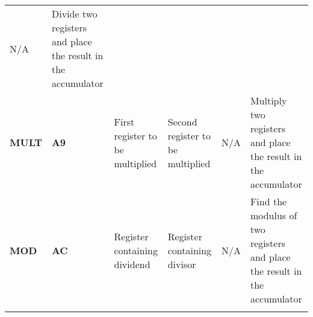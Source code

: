 \documentclass[]{article}
\begin{document}
\begin{longtable}[c]{@{}llllll@{}}
\begin{minipage}[t]{0.14\columnwidth}
N/A
\strut\end{minipage} &
\begin{minipage}[t]{0.14\columnwidth}\raggedright\strut
Divide two registers and place the result in the accumulator
\strut\end{minipage}\tabularnewline
\begin{minipage}[t]{0.14\columnwidth}\raggedright\strut
\textbf{MULT}
\strut\end{minipage} &
\begin{minipage}[t]{0.14\columnwidth}\raggedright\strut
\textbf{A9}
\strut\end{minipage} &
\begin{minipage}[t]{0.14\columnwidth}\raggedright\strut
First register to be multiplied
\strut\end{minipage} &
\begin{minipage}[t]{0.14\columnwidth}\raggedright\strut
Second register to be multiplied
\strut\end{minipage} &
\begin{minipage}[t]{0.14\columnwidth}\raggedright\strut
N/A
\strut\end{minipage} &
\begin{minipage}[t]{0.14\columnwidth}\raggedright\strut
Multiply two registers and place the result in the accumulator
\strut\end{minipage}\tabularnewline
\begin{minipage}[t]{0.14\columnwidth}\raggedright\strut
\textbf{MOD}
\strut\end{minipage} &
\begin{minipage}[t]{0.14\columnwidth}\raggedright\strut
\textbf{AC}
\strut\end{minipage} &
\begin{minipage}[t]{0.14\columnwidth}\raggedright\strut
Register containing dividend
\strut\end{minipage} &
\begin{minipage}[t]{0.14\columnwidth}\raggedright\strut
Register containing divisor
\strut\end{minipage} &
\begin{minipage}[t]{0.14\columnwidth}\raggedright\strut
N/A
\strut\end{minipage} &
\begin{minipage}[t]{0.14\columnwidth}\raggedright\strut
Find the modulus of two registers and place the result in the
accumulator
\strut\end{minipage}\tabularnewline
\begin{minipage}[t]{0.14\columnwidth}\raggedright\strut

\end{minipage}
\end{longtable}
\end{document}

